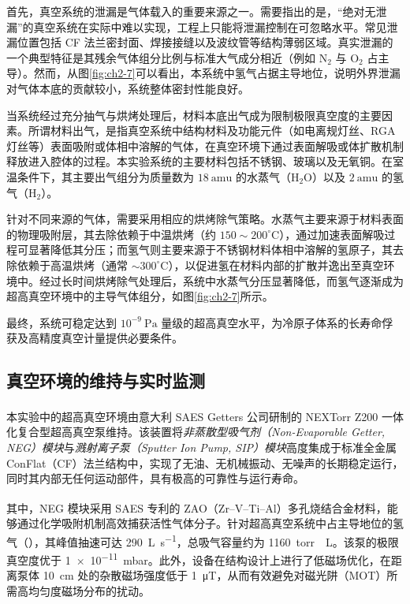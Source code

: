 首先，真空系统的泄漏是气体载入的重要来源之一。需要指出的是，“绝对无泄漏”的真空系统在实际中难以实现，工程上只能将泄漏控制在可忽略水平。常见泄漏位置包括 CF 法兰密封面、焊接接缝以及波纹管等结构薄弱区域。真实泄漏的一个典型特征是其残余气体组分比例与标准大气成分相近（例如 $\mathrm{N}_2$ 与 $\mathrm{O}_2$ 占主导）。然而，从图\ref{fig:ch2-7}可以看出，本系统中氢气占据主导地位，说明外界泄漏对气体本底的贡献较小，系统整体密封性能良好。

当系统经过充分抽气与烘烤处理后，材料本底出气成为限制极限真空度的主要因素。所谓材料出气，是指真空系统中结构材料及功能元件（如电离规灯丝、RGA 灯丝等）表面吸附或体相中溶解的气体，在真空环境下通过表面解吸或体扩散机制释放进入腔体的过程。本实验系统的主要材料包括不锈钢、玻璃以及无氧铜。在室温条件下，其主要出气组分为质量数为 $18~\mathrm{amu}$ 的水蒸气（$\mathrm{H}_2\mathrm{O}$）以及 $2~\mathrm{amu}$ 的氢气（$\mathrm{H}_2$）。

针对不同来源的气体，需要采用相应的烘烤除气策略。水蒸气主要来源于材料表面的物理吸附层，其去除依赖于中温烘烤（约 $150 \sim 200^\circ\mathrm{C}$），通过加速表面解吸过程可显著降低其分压；而氢气则主要来源于不锈钢材料体相中溶解的氢原子，其去除依赖于高温烘烤（通常 $\sim 300^\circ\mathrm{C}$），以促进氢在材料内部的扩散并逸出至真空环境中。经过长时间烘烤除气处理后，系统中水蒸气分压显著降低，而氢气逐渐成为超高真空环境中的主导气体组分，如图\ref{fig:ch2-7}所示。

最终，系统可稳定达到 $10^{-9}~\mathrm{Pa}$ 量级的超高真空水平，为冷原子体系的长寿命俘获及高精度真空计量提供必要条件。


\subsection{真空环境的维持与实时监测}

本实验中的超高真空环境由意大利 SAES Getters 公司研制的 NEXTorr\textsuperscript{\textregistered} Z200 一体化复合型超高真空泵维持。该装置将\textit{非蒸散型吸气剂（Non-Evaporable Getter, NEG）模块}与\textit{溅射离子泵（Sputter Ion Pump, SIP）模块}高度集成于标准全金属 ConFlat（CF）法兰结构中，实现了无油、无机械振动、无噪声的长期稳定运行，同时其内部无任何运动部件，具有极高的可靠性与运行寿命。

其中，NEG 模块采用 SAES 专利的 ZAO\textsuperscript{\textregistered}（Zr–V–Ti–Al）多孔烧结合金材料，能够通过化学吸附机制高效捕获活性气体分子。针对超高真空系统中占主导地位的氢气（），其峰值抽速可达 \SI{290}{\liter\per\second}，总吸气容量约为 \SI{1160}{torr\cdot\liter}。该泵的极限真空度优于 \SI{1e-11}{mbar}。此外，设备在结构设计上进行了低磁场优化，在距离泵体 \SI{10}{\centi\meter} 处的杂散磁场强度低于 \SI{1}{\micro\tesla}，从而有效避免对磁光阱（MOT）所需高均匀度磁场分布的扰动\cite{NEXTorrUHVPumps}。


